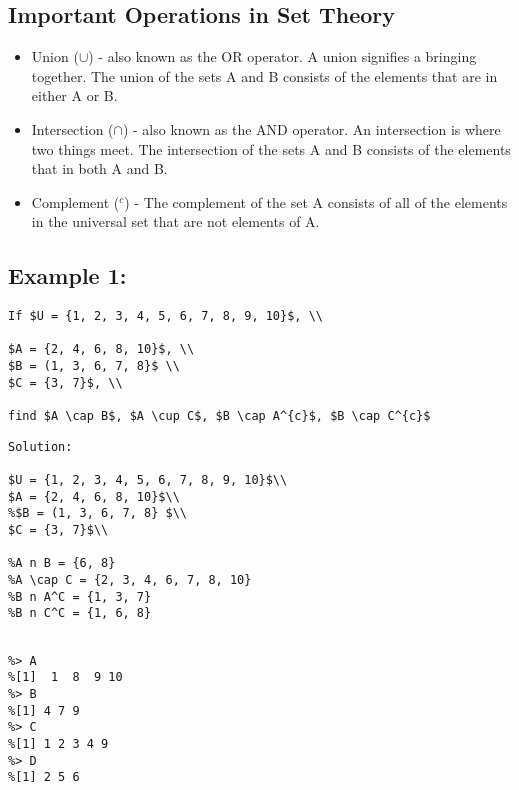 
\subsection{Important Operations in Set Theory}

\begin{itemize}
\item Union ($\cup$) - also known as the OR operator. A union signifies a bringing together. The union of the sets A and B consists of the elements that are in either A or B.
\item Intersection ($\cap$) - also known as the AND operator. An intersection is where two things meet. The intersection of the sets A and B consists of the elements that in both A and B.
\item Complement ($^{c}$) - The complement of the set A consists of all of the elements in the universal set that are not elements of A.
\end{itemize}



\subsection*{Example 1: }
\begin{verbatim}
If $U = {1, 2, 3, 4, 5, 6, 7, 8, 9, 10}$, \\

$A = {2, 4, 6, 8, 10}$, \\
$B = (1, 3, 6, 7, 8}$ \\
$C = {3, 7}$, \\

find $A \cap B$, $A \cup C$, $B \cap A^{c}$, $B \cap C^{c}$
\end{verbatim}
\begin{verbatim}
Solution: 

$U = {1, 2, 3, 4, 5, 6, 7, 8, 9, 10}$\\
$A = {2, 4, 6, 8, 10}$\\
%$B = (1, 3, 6, 7, 8} $\\
$C = {3, 7}$\\

%A n B = {6, 8}
%A \cap C = {2, 3, 4, 6, 7, 8, 10}
%B n A^C = {1, 3, 7}
%B n C^C = {1, 6, 8}
\end{verbatim}
\begin{verbatim}

%> A
%[1]  1  8  9 10
%> B
%[1] 4 7 9
%> C
%[1] 1 2 3 4 9
%> D
%[1] 2 5 6
\end{verbatim}






